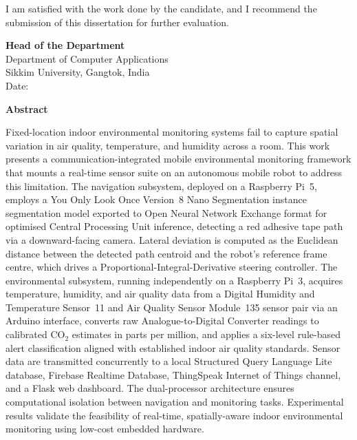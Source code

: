 \documentclass[12pt,a4paper,oneside]{report}
\newcommand{\fmchapter}[1]{%
  \clearpage\phantomsection
  \begin{center}{\LARGE\bfseries #1}\end{center}
  \vspace{0.5cm}
  \addcontentsline{toc}{chapter}{#1}%
}
\begin{document}
\vspace{0.6cm}
\noindent
I am satisfied with the work done by the candidate, and I recommend the submission
of this dissertation for further evaluation.

\vspace{3cm}
\begin{flushright}
\textbf{Head of the Department}\\
Department of Computer Applications\\
Sikkim University, Gangtok, India\\[0.4cm]
Date:\underline{\hspace{4cm}}
\end{flushright}

\newpage
\thispagestyle{plain}
\fmchapter{Abstract}

\noindent
Fixed-location indoor environmental monitoring systems fail to capture spatial
variation in air quality, temperature, and humidity across a room. This work
presents a communication-integrated mobile environmental monitoring framework
that mounts a real-time sensor suite on an autonomous mobile robot to address
this limitation. The navigation subsystem, deployed on a Raspberry Pi~5, employs
a You Only Look Once Version~8 Nano Segmentation instance segmentation model exported to Open Neural Network Exchange format for optimised
Central Processing Unit inference, detecting a red adhesive tape path via a downward-facing camera.
Lateral deviation is computed as the Euclidean distance between the detected path
centroid and the robot's reference frame centre, which drives a
Proportional-Integral-Derivative steering controller. The environmental
subsystem, running independently on a Raspberry Pi~3, acquires temperature,
humidity, and air quality data from a Digital Humidity and Temperature Sensor~11 and Air Quality Sensor Module~135 sensor pair via an Arduino
interface, converts raw Analogue-to-Digital Converter readings to calibrated \(\text{CO}_2\) estimates in
parts per million, and applies a six-level rule-based alert classification
aligned with established indoor air quality standards. Sensor data are
transmitted concurrently to a local Structured Query Language Lite database, Firebase Realtime Database,
ThingSpeak Internet of Things channel, and a Flask web dashboard. The dual-processor architecture
ensures computational isolation between navigation and monitoring tasks.
Experimental results validate the feasibility of real-time, spatially-aware
indoor environmental monitoring using low-cost embedded hardware.
\end{document}
